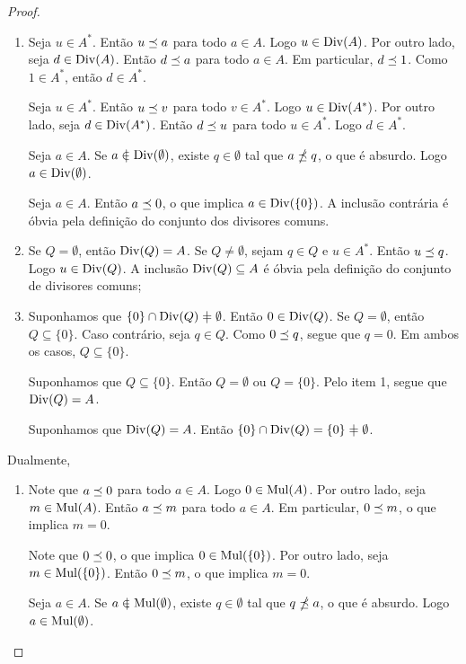 \begin{proof}
	\begin{enumerate}
	\item Seja $u \in A^*$. Então $u \preceq a$ para todo $a \in A$. Logo $u \in \operatorname{Div}(A)$. Por outro lado, seja $d \in \operatorname{Div}(A)$. Então $d \preceq a$ para todo $a \in A$. Em particular, $d \preceq 1$. Como $1 \in A^*$, então $d \in A^*$.

	Seja $u \in A^*$. Então $u \preceq v$ para todo $v \in A^*$. Logo $u \in \operatorname{Div}(A^*)$. Por outro lado, seja $d \in \operatorname{Div}(A^*)$. Então $d \preceq u$ para todo $u \in A^*$. Logo $d \in A^*$.

	Seja $a \in A$. Se $a \notin \divv(\emptyset)$, existe $q \in \emptyset$ tal que $a \npreceq q$, o que é absurdo. Logo $a \in \operatorname{Div}(\emptyset)$.

	Seja $a \in A$. Então $a \preceq 0$, o que implica $a \in \operatorname{Div}(\{0\})$. A inclusão contrária é óbvia pela definição do conjunto dos divisores comuns.

	\item Se $Q = \emptyset$, então $\operatorname{Div}(Q) = A$. Se $Q \neq \emptyset$, sejam $q \in Q$ e $u \in A^*$. Então $u \preceq q$. Logo $u \in \operatorname{Div}(Q)$. A inclusão $\operatorname{Div}(Q) \subseteq A$ é óbvia pela definição do conjunto de divisores comuns;

	\item Suponhamos que $\{0\} \cap \divv(Q) \neq \emptyset$. Então $0 \in \operatorname{Div}(Q)$. Se $Q = \emptyset$, então $Q \subseteq \{0\}$. Caso contrário, seja $q \in Q$. Como $0 \preceq q$, segue que $q=0$. Em ambos os casos, $Q \subseteq \{0\}$.

	Suponhamos que $Q \subseteq \{0\}$. Então $Q=\emptyset$ ou $Q=\{0\}$. Pelo item 1, segue que $\operatorname{Div}(Q)=A$.

	Suponhamos que $\operatorname{Div}(Q)=A$. Então $\{0\} \cap \divv(Q) = \{0\} \neq \emptyset$.
	\end{enumerate}

Dualmente,
	\begin{enumerate}
	\item Note que $a \preceq 0$ para todo $a \in A$. Logo $0 \in \operatorname{Mul}(A)$. Por outro  lado, seja $m \in \operatorname{Mul}(A)$. Então $a \preceq m$ para todo $a \in A$. Em particular, $0 \preceq m$, o que implica $m=0$.

	Note que $0 \preceq 0$, o que implica $0 \in \operatorname{Mul}(\{0\})$. Por outro lado, seja $m \in \operatorname{Mul}(\{0\})$. Então $0 \preceq m$, o que implica $m=0$.

	Seja $a \in A$. Se $a \notin \mul(\emptyset)$, existe $q \in \emptyset$ tal que $q \npreceq a$, o que é absurdo. Logo $a \in \operatorname{Mul}(\emptyset)$.


\end{enumerate}
\end{proof}
